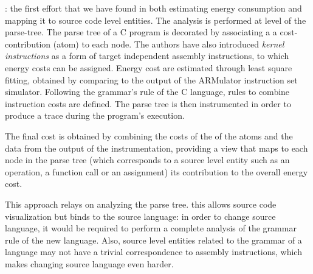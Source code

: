 \cite{brando2008}: the first effort that we have found in both estimating energy consumption and mapping it to source code level entities. The analysis is performed at level of the parse-tree. The parse tree of a C program is decorated by associating a a cost-contribution (atom) to each node. The authors have also introduced \emph{kernel instructions} as a form of target independent assembly instructions, to which energy costs can be assigned. Energy cost are estimated through least square fitting, obtained by comparing to the output of the ARMulator instruction set simulator. Following the grammar's rule of the C language, rules to combine instruction costs are defined. The parse tree is then instrumented in order to produce a trace during the program's execution. \par 
The final cost is obtained by combining the costs of the of the atoms and the data from the output of the instrumentation, providing a view that maps to each node in the parse tree (which corresponds to a source level entity such as an operation, a function call or an assignment) its contribution to the overall energy cost. \par 
This approach relays on analyzing the parse tree. this allows source code visualization but binds to the source language: in order to change source language, it would be required to perform a complete analysis of the grammar rule of the new language. Also, source level entities related to the grammar of a language may not have a trivial correspondence to assembly instructions, which makes changing source language even harder. \\[1in]


